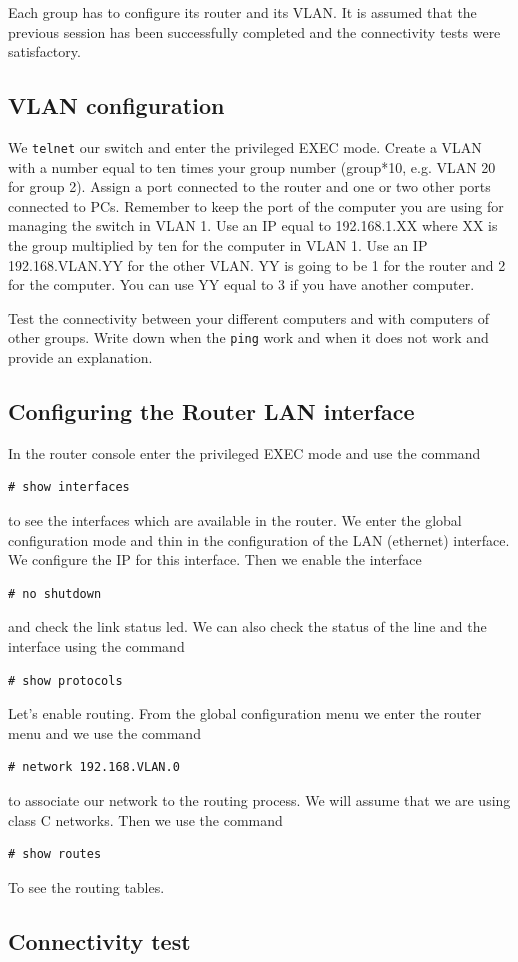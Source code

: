 Each group has to configure its router and its VLAN.
It is assumed that the previous session has been successfully completed and the connectivity tests were satisfactory.

\subsection{VLAN configuration}
We \texttt{telnet} our switch and enter the privileged EXEC mode.
Create a VLAN with a number equal to ten times your group number (group*10, e.g. VLAN 20 for group 2).
Assign a port connected to the router and one or two other ports connected to PCs. 
Remember to keep the port of the computer you are using for managing the switch in VLAN 1.
Use an IP equal to 192.168.1.XX where XX is the group multiplied by ten for the computer in VLAN 1.
Use an IP 192.168.VLAN.YY for the other VLAN. 
YY is going to be 1 for the router and 2 for the computer.
You can use YY equal to 3 if you have another computer.

Test the connectivity between your different computers and with computers of other groups.
Write down when the \texttt{ping} work and when it does not work and provide an explanation.

\subsection{Configuring the Router LAN interface}

In the router console enter the privileged EXEC mode and use the command 
\begin{lstlisting}
# show interfaces
\end{lstlisting}
to see the interfaces which are available in the router.
We enter the global configuration mode and thin in the configuration of the LAN (ethernet) interface.
We configure the IP for this interface.
Then we enable the interface
\begin{lstlisting}
# no shutdown
\end{lstlisting}
and check the link status led.
We can also check the status of the line and the interface using the command
\begin{lstlisting}
# show protocols
\end{lstlisting}

Let's enable routing.
From the global configuration menu we enter the router menu and we use the command
\begin{lstlisting}
# network 192.168.VLAN.0
\end{lstlisting}
to associate our network to the routing process.
We will assume that we are using class C networks.
Then we use the command
\begin{lstlisting}
# show routes
\end{lstlisting}
To see the routing tables.

\subsection{Connectivity test}
